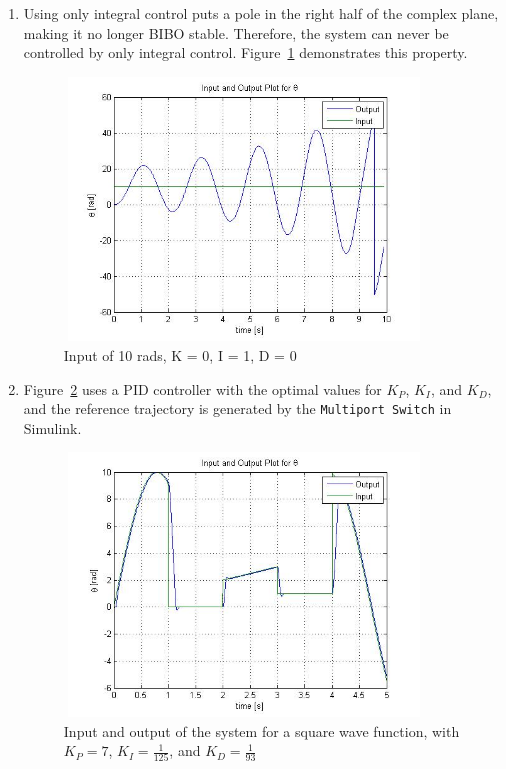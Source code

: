 \documentclass[letterpaper, 11pt, openany]{book}
\begin{document}
\begin{enumerate}
 \item Using only integral control puts a pole in the right half of the complex plane, making it no longer 
 BIBO stable. Therefore, the system can never be controlled by only integral control. Figure~\ref{fig:Integral}
 demonstrates this property.  
\begin{figure}[htbp]
\centering
\includegraphics[width=0.9\textwidth, height = 7cm]{graphics/Integral.jpg} 
\caption{Input of 10 rads, K = 0, I = 1, D = 0}\label{fig:Integral}
\end{figure}
 
\item Figure~\ref{fig:Multiport} uses a PID controller with the optimal values for $K_P$, $K_I$, 
and $K_D$, and the reference trajectory is generated by the \verb|Multiport Switch| in Simulink. 
 
\begin{figure}[htbp]
\centering
\includegraphics[width=0.9\textwidth, height = 7cm]{graphics/Multiport.jpg} 
\caption{Input and output of the system for a square wave function, with $K_P = 7$, $K_I = \frac{1}{125}$, and $K_D = \frac{1}{93}$}\label{fig:Multiport}
\end{figure}

\end{enumerate} 
 
\end{document}
